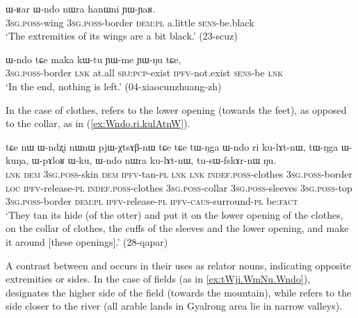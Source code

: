 \begin{exe}
\ex \label{ex:WRar.Wndo}
\gll ɯ-ʁar ɯ-ndo nɯra hanɯni ɲɯ-ɲaʁ. \\ 
\textsc{3sg}.\textsc{poss}-wing \textsc{3sg}.\textsc{poss}-border \textsc{dem}:\textsc{pl} a.little \textsc{sens}-be.black \\
\glt  `The extremities of its wings are a bit black.' (23-scuz)
\end{exe}

\begin{exe}
\ex \label{ex:Wndo.tCe}
\gll  ɯ-ndo tɕe maka kɯ-tu ɲɯ-me ɲɯ-ŋu tɕe,  \\
\textsc{3sg}.\textsc{poss}-border \textsc{lnk} at.all \textsc{sbj}:\textsc{pcp}-exist \textsc{ipfv}-not.exist \textsc{sens}-be \textsc{lnk} \\
\glt `In the end, nothing is left.' (04-xiaocunzhuang-zh)
\end{exe}

In the case of clothes,  refers to the lower opening (towards the feet), as opposed to the collar, as in (\ref{ex:Wndo.ri.kulAtnW}).

\begin{exe}
\ex \label{ex:Wndo.ri.kulAtnW}
\gll tɕe nɯ ɯ-ndʐi nɯnɯ pjɯ-χtsɤβ-nɯ tɕe tɕe tɯ-ŋga ɯ-ndo ri ku-lɤt-nɯ, tɯ-ŋga ɯ-kuŋa, ɯ-pɤloʁ ɯ-ku, ɯ-ndo nɯra ku-lɤt-nɯ,  tu-sɯ-fskɤr-nɯ ŋu.   \\
\textsc{lnk} \textsc{dem} \textsc{3sg}.\textsc{poss}-skin \textsc{dem} \textsc{ipfv}-tan-\textsc{pl} \textsc{lnk} \textsc{lnk} \textsc{indef}.\textsc{poss}-clothes \textsc{3sg}.\textsc{poss}-border \textsc{loc} \textsc{ipfv}-release-\textsc{pl} \textsc{indef}.\textsc{poss}-clothes \textsc{3sg}.\textsc{poss}-collar \textsc{3sg}.\textsc{poss}-sleeves \textsc{3sg}.\textsc{poss}-top \textsc{3sg}.\textsc{poss}-border  \textsc{dem}:\textsc{pl}  \textsc{ipfv}-release-\textsc{pl} \textsc{ipfv}-\textsc{caus}-surround-\textsc{pl} be:\textsc{fact} \\
\glt `They tan its hide (of the otter) and put it on the lower opening of the clothes, on the collar of clothes, the cuffs of the sleeves and the lower opening, and make it around [these openings].' (28-qapar)
\end{exe} 


A contrast between  and  occurs in their uses as relator nouns, indicating opposite extremities or sides. In the case of fields (as in \ref{ex:tWji.WmNu.Wndo}),  designates the higher side of the field (towards the mountain), while  refers to the side closer to the river (all arable lands in Gyalrong area lie in narrow valleys).

